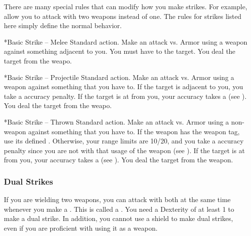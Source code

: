     There are many special rules that can modify how you make strikes.
    For example,  allow you to attack with two weapons instead of one.
    The rules for strikes listed here simply define the normal behavior.

    \begin{activeability}*{Basic Strike -- Melee}
      \abilityusagetime Standard action.
      \rankline
      Make an attack vs. Armor using a weapon against something adjacent to you.
      You must have  to the target.
      \hit You deal the target  from the weapo.
    \end{activeability}

    \begin{activeability}*{Basic Strike -- Projectile}
      \abilityusagetime Standard action.
      \rankline
      Make an attack vs. Armor using a  weapon against something that you have  to.
      If the target is adjacent to you, you take a  accuracy penalty.
      If the target is at  from you, your accuracy takes a   (see ).
      \hit You deal the target  from the weapo.
    \end{activeability}

    \begin{activeability}*{Basic Strike -- Thrown}
      \abilityusagetime Standard action.
      \rankline
      Make an attack vs. Armor using a non- weapon against something that you have  to.
      If the weapon has the  weapon tag, use its defined .
      Otherwise, your range limits are 10/20, and you take a  accuracy penalty since you are not  with that usage of the weapon (see ).
      If the target is at  from you, your accuracy takes a   (see ).
      \hit You deal the target  from the weapon.
    \end{activeability}

    \subsubsection{Dual Strikes}\label{Dual Strikes}
      If you are wielding two weapons, you can attack with both at the same time whenever you make a .
      This is called a .
      You need a Dexterity of at least 1 to make a dual strike.
      In addition, you cannot use a shield to make dual strikes, even if you are proficient with using it as a weapon.

